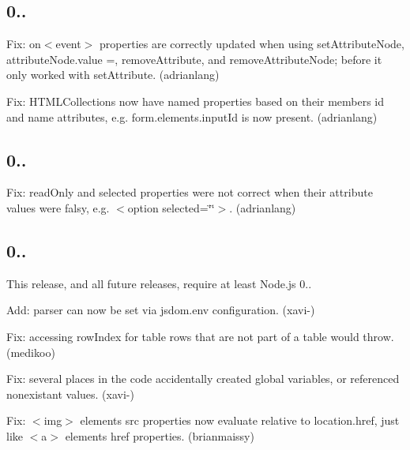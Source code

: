 \subsection*{0..}


\begin{DoxyItemize}
\item Fix\+: {\ttfamily on$<$event$>$} properties are correctly updated when using {\ttfamily set\+Attribute\+Node}, {\ttfamily attribute\+Node.\+value =}, {\ttfamily remove\+Attribute}, and {\ttfamily remove\+Attribute\+Node}; before it only worked with {\ttfamily set\+Attribute}. (adrianlang)
\item Fix\+: {\ttfamily H\+T\+M\+L\+Collection}s now have named properties based on their members\textquotesingle{} {\ttfamily id} and {\ttfamily name} attributes, e.\+g. {\ttfamily form.\+elements.\+input\+Id} is now present. (adrianlang)
\end{DoxyItemize}

\subsection*{0..}


\begin{DoxyItemize}
\item Fix\+: {\ttfamily read\+Only} and {\ttfamily selected} properties were not correct when their attribute values were falsy, e.\+g. {\ttfamily $<$option selected=\char`\"{}\char`\"{}$>$}. (adrianlang)
\end{DoxyItemize}

\subsection*{0..}

This release, and all future releases, require at least Node.\+js 0..


\begin{DoxyItemize}
\item Add\+: parser can now be set via {\ttfamily jsdom.\+env} configuration. (xavi-\/)
\item Fix\+: accessing {\ttfamily row\+Index} for table rows that are not part of a table would throw. (medikoo)
\item Fix\+: several places in the code accidentally created global variables, or referenced nonexistant values. (xavi-\/)
\item Fix\+: {\ttfamily $<$img$>$} elements\textquotesingle{} {\ttfamily src} properties now evaluate relative to {\ttfamily location.\+href}, just like {\ttfamily $<$a$>$} elements\textquotesingle{} {\ttfamily href} properties. (brianmaissy)
\end{DoxyItemize}

